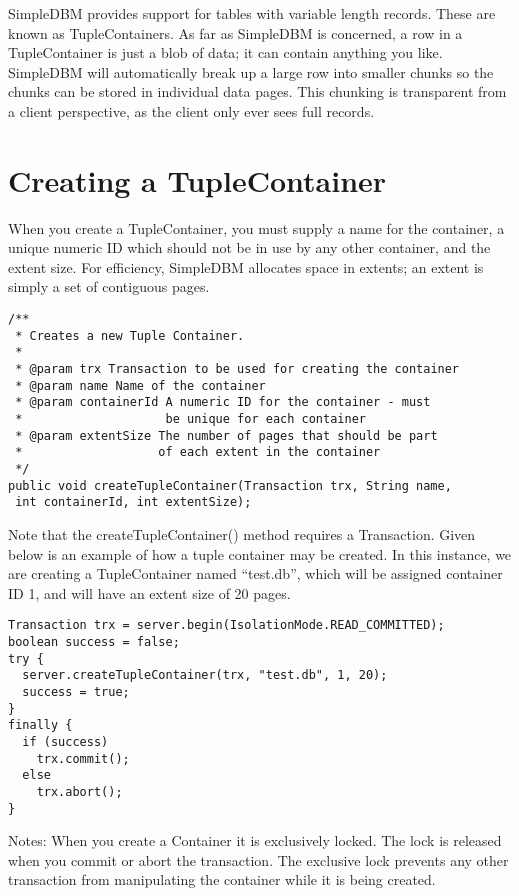 \documentclass[a4paper,draft,oneside]{book}
\begin{document}
SimpleDBM provides support for tables with variable length records.
These are known as TupleContainers.  As far as SimpleDBM is concerned,
a row in a TupleContainer is just a blob of data; it can contain
anything you like. SimpleDBM will automatically break up a large row
into smaller chunks so the chunks can be stored in individual data
pages. This chunking is transparent from a client perspective, as the
client only ever sees full records.

\section{Creating a TupleContainer}

When you create a TupleContainer, you must supply a name for the
container, a unique numeric ID which should not be in use by any other
container, and the extent size. For efficiency, SimpleDBM allocates
space in extents; an extent is simply a set of contiguous pages.

\begin{verbatim}
/**
 * Creates a new Tuple Container. 
 * 
 * @param trx Transaction to be used for creating the container
 * @param name Name of the container
 * @param containerId A numeric ID for the container - must 
 *                    be unique for each container
 * @param extentSize The number of pages that should be part 
 *                   of each extent in the container
 */
public void createTupleContainer(Transaction trx, String name,
 int containerId, int extentSize);
\end{verbatim}

Note that the createTupleContainer() method requires a Transaction.
Given below is an example of how a tuple container may be created.
In this instance, we are creating a TupleContainer named ``test.db'', which
will be assigned container ID 1, and will have an extent size of 20 pages.

\begin{verbatim}
Transaction trx = server.begin(IsolationMode.READ_COMMITTED);
boolean success = false;
try {
  server.createTupleContainer(trx, "test.db", 1, 20);
  success = true;
}
finally {
  if (success)
    trx.commit();			
  else 
    trx.abort();
}
\end{verbatim}

Notes: When you create a Container it is exclusively locked. The lock
is released when you commit or abort the transaction. The exclusive lock
prevents any other transaction from manipulating the container while it is
being created.
\end{document}

